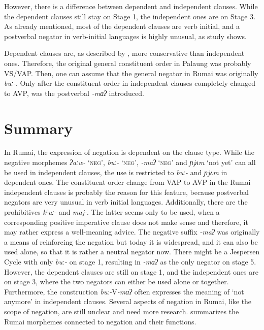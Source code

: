\documentclass[output=paper,colorlinks,citecolor=brown]{langscibook}
\begin{document}
However, there is a difference between dependent and independent clauses. While the dependent clauses still stay on Stage 1, the independent ones are on Stage 3. As already mentioned, most of the dependent clauses are verb initial, and a postverbal negator in verb-initial languages is highly unusual, as  study shows.

Dependent clauses are, as described by \citet{Bybee2001}, more conservative than independent ones. Therefore, the original general constituent order in Palaung was probably VS/VAP. Then, one can assume that the general negator in Rumai was originally \textit{buː{}-}. Only after the constituent order in independent clauses completely changed to AVP, was the postverbal \textit{{}-mɑʔ} introduced. \citep{Weymuth2014}

\section{Summary} \label{sec:rum:5}

In Rumai, the expression of negation is dependent on the clause type. While the negative morphemes \textit{ʔaːw-} ‘\textsc{neg}’, \textit{buː-} ‘\textsc{neg}’, \textit{{}-maʔ} ‘\textsc{neg}’ and \textit{ɲjʌm} ‘not yet’ can all be used in independent clauses, the use is restricted to \textit{buː-} and \textit{ɲjʌm} in dependent ones. The constituent order change from VAP to AVP in the Rumai independent clauses is probably the reason for this feature, because postverbal negators are very unusual in verb initial languages. Additionally, there are the prohibitives \textit{kʰuː{}-} and \textit{maj-}. The latter seems only to be used, when a corresponding positive imperative clause does not make sense and therefore, it may rather express a well-meaning advice. The negative suffix \textit{{}-maʔ} was originally a means of reinforcing the negation but today it is widespread, and it can also be used alone, so that it is rather a neutral negator now. There might be a Jespersen Cycle with only \textit{buː-} on stage 1, resulting in \textit{{}-mɑʔ} as the only negator on stage 5. However, the dependent clauses are still on stage 1, and the independent ones are on stage 3, where the two negators can either be used alone or together. Furthermore, the construction \textit{buː-}V\textit{{}-mɑʔ} often expresses the meaning of ‘not anymore’ in independent clauses. Several aspects of negation in Rumai, like the scope of negation, are still unclear and need more research.  summarizes the Rumai morphemes connected to negation and their functions.
\end{document}
